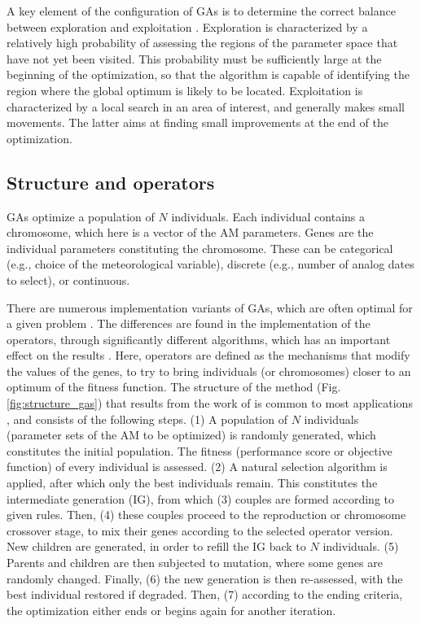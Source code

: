 \documentclass{ametsoc}
\begin{document}
A key element of the configuration of GAs is to determine the correct balance between exploration and exploitation \citep{Back1992a, Smith1997a}. Exploration is characterized by a relatively high probability of assessing the regions of the parameter space that have not yet been visited. This probability must be sufficiently large at the beginning of the optimization, so that the algorithm is capable of identifying the region where the global optimum is likely to be located. Exploitation is characterized by a local search in an area of interest, and generally makes small movements. The latter aims at finding small improvements at the end of the optimization.


\subsection{Structure and operators}
\label{sec:gas:operators}

GAs optimize a population of $N$ individuals. Each individual contains a chromosome, which here is a vector of the AM parameters. Genes are the individual parameters constituting the chromosome. These can be categorical (e.g., choice of the meteorological variable), discrete (e.g., number of analog dates to select), or continuous.

There are numerous implementation variants of GAs, which are often optimal for a given problem \citep{Hart1991a, Schraudolph1992a}. The differences are found in the implementation of the operators, through significantly different algorithms, which has an important effect on the results \citep{Gaffney2010a}. Here, operators are defined as the mechanisms that modify the values of the genes, to try to bring individuals (or chromosomes) closer to an optimum of the fitness function. The structure of the method (Fig. \ref{fig:structure_gas}) that results from the work of \citet{Holland1992b} is common to most applications \citep{Back1993b}, and consists of the following steps. (1) A population of $N$ individuals (parameter sets of the AM to be optimized) is randomly generated, which constitutes the initial population. The fitness (performance score or objective function) of every individual is assessed. (2) A natural selection algorithm is applied, after which only the best individuals remain. This constitutes the intermediate generation (IG), from which (3) couples are formed according to given rules. Then, (4) these couples proceed to the reproduction or chromosome crossover stage, to mix their genes according to the selected operator version. New children are generated, in order to refill the IG back to $N$ individuals. (5) Parents and children are then subjected to mutation, where some genes are randomly changed. Finally, (6) the new generation is then re-assessed, with the best individual restored if degraded. Then, (7) according to the ending criteria, the optimization either ends or begins again for another iteration.
\end{document}
